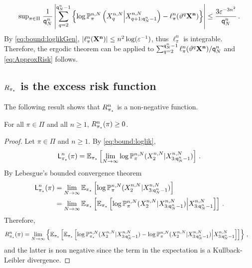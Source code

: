 \begin{equation}
\label{eq:linfty}
\sup_{\pi\in\Pi}\;\frac{1}{\ordermax{n}{N}}\left|\sum_{q=2}^{\ordermax{n}{N}-1} \left\{ \log \likelihood{n,N}{\pi}\left(X_{q}^{n,N}\middle|X_{q+1:\ordermax{n}{N}-1}^{n,N}\right) - \ell_{\pi}^{n}(\shift^q{\bf X^{n}})\right\}\right|\le\frac{3\varepsilon^{- 3n^2}}{\ordermax{n}{N}}
\eqsp.
\end{equation}
%
By \eqref{eq:bound:loglikGen}, $|\ell_{\pi}^{n}({\bf X^{n}})|\le n^2 \log(\varepsilon^{-1})$, thus $\ell_{\pi}^{n}$ is integrable. Therefore, the ergodic theorem \cite[Theorem~24.1]{billingsley:1995} can be applied to $\sum_{q=2}^{{\mathsf{q}}^{n}_{N}-1}\ell_{\pi}^{n}(\vartheta^q{\bf X^{n}})/{\mathsf{q}}^{n}_{N}$ and \eqref{eq:ApproxRisk} follows.

\subsection{$R_{\pi_{\star}}$ is the excess risk function}
The following result shows that $R^n_{\pi_{\star}}$ is a non-negative function.
%
\begin{proposition}
\label{prop:max:likelihood}
For all $\pi\in\Pi$ and all $n\ge 1$, $R^n_{\pi_{\star}}(\pi)\ge 0$.
\end{proposition}
%
\begin{proof}
Let $\pi\in\Pi$ and $n\ge 1$. By \eqref{eq:bound:loglik},
\[
\mathsf{L}^n_{\pi_{\star}}(\pi) = \mathbb{E}_{\pi_{\star}}\left[\lim_{N\to \infty}\log \mathbb{P}^{n,N}_{\pi}(X_{2}^{n,N}|X_{3:{\mathsf{q}}^{n}_{N}-1}^{n,N})\right]\,.
\]
By Lebesgue's bounded convergence theorem 
\begin{align*}
\kullback^n_{\bayes}(\pi) &= \lim_{N\to \infty}\E_{\bayes}\left[\log \likelihood{n,N}{\pi}(X_{2}^{n,N}|X_{3:\ordermax{n}{N}-1}^{n,N})\right]\\
&= \lim_{N\to \infty}\E_{\bayes}\left[\E_{\bayes}\left[\log \likelihood{n,N}{\pi}(X_{2}^{n,N}|X_{3:\ordermax{n}{N}-1}^{n,N})\middle|X_{3:\ordermax{n}{N}-1}^{n,N}\right]\right]\eqsp.
\end{align*}
Therefore, 
\begin{align*}
R^n_{\bayes}(\pi) &=  \lim_{N\to \infty}\left\{\E_{\bayes}\left[\E_{\bayes}\left[\log \likelihood{n,N}{\bayes}(X_{2}^{n,N}|X_{3:\ordermax{n}{N}-1}^{n,N}) - \log \likelihood{n,N}{\pi}(X_{2}^{n,N}|X_{3:\ordermax{n}{N}-1}^{n,N})\middle|X_{3:\ordermax{n}{N}-1}^{n,N}\right]\right]\right\}\eqsp,
\end{align*}
and the latter is non negative since the term in the expectation is a Kullback-Leibler divergence.
\end{proof}




